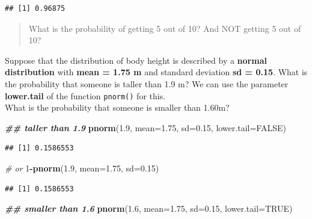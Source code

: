 \documentclass[
]{book}
\newenvironment{Shaded}{\begin{snugshade}}{\end{snugshade}}
\newcommand{\AttributeTok}[1]{\textcolor[rgb]{0.13,0.29,0.53}{#1}}
\newcommand{\CommentTok}[1]{\textcolor[rgb]{0.56,0.35,0.01}{\textit{#1}}}
\newcommand{\ConstantTok}[1]{\textcolor[rgb]{0.56,0.35,0.01}{#1}}
\newcommand{\DecValTok}[1]{\textcolor[rgb]{0.00,0.00,0.81}{#1}}
\newcommand{\DocumentationTok}[1]{\textcolor[rgb]{0.56,0.35,0.01}{\textbf{\textit{#1}}}}
\newcommand{\FloatTok}[1]{\textcolor[rgb]{0.00,0.00,0.81}{#1}}
\newcommand{\FunctionTok}[1]{\textcolor[rgb]{0.13,0.29,0.53}{\textbf{#1}}}
\newcommand{\NormalTok}[1]{#1}
\newcommand{\SpecialCharTok}[1]{\textcolor[rgb]{0.81,0.36,0.00}{\textbf{#1}}}
\begin{document}
\begin{verbatim}
## [1] 0.96875
\end{verbatim}

\begin{quote}
What is the probability of getting 5 out of 10? And NOT getting 5 out of 10?
\end{quote}

Suppose that the distribution of body height is described by a \textbf{normal distribution} with \textbf{mean = 1.75 m} and standard deviation \textbf{sd = 0.15}. What is the probability that someone is taller than 1.9 m? We can use the parameter \textbf{lower.tail} of the function \texttt{pnorm()} for this.\\
What is the probability that someone is smaller than 1.60m?

\begin{Shaded}
\begin{Highlighting}[]
\DocumentationTok{\#\# taller than 1.9}
\FunctionTok{pnorm}\NormalTok{(}\FloatTok{1.9}\NormalTok{, }\AttributeTok{mean=}\FloatTok{1.75}\NormalTok{, }\AttributeTok{sd=}\FloatTok{0.15}\NormalTok{, }\AttributeTok{lower.tail=}\ConstantTok{FALSE}\NormalTok{)}
\end{Highlighting}
\end{Shaded}

\begin{verbatim}
## [1] 0.1586553
\end{verbatim}

\begin{Shaded}
\begin{Highlighting}[]
\CommentTok{\# or}
\DecValTok{1}\SpecialCharTok{{-}}\FunctionTok{pnorm}\NormalTok{(}\FloatTok{1.9}\NormalTok{, }\AttributeTok{mean=}\FloatTok{1.75}\NormalTok{, }\AttributeTok{sd=}\FloatTok{0.15}\NormalTok{)}
\end{Highlighting}
\end{Shaded}

\begin{verbatim}
## [1] 0.1586553
\end{verbatim}

\begin{Shaded}
\begin{Highlighting}[]
\DocumentationTok{\#\# smaller than 1.6}
\FunctionTok{pnorm}\NormalTok{(}\FloatTok{1.6}\NormalTok{, }\AttributeTok{mean=}\FloatTok{1.75}\NormalTok{, }\AttributeTok{sd=}\FloatTok{0.15}\NormalTok{, }\AttributeTok{lower.tail=}\ConstantTok{TRUE}\NormalTok{)}
\end{Highlighting}
\end{Shaded}
\end{document}
